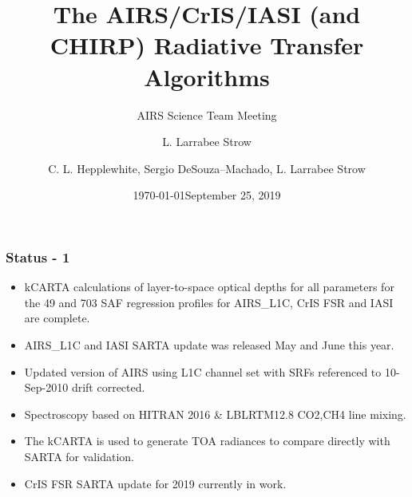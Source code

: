 \documentclass[10pt,t]{beamer}
\author{L. Larrabee Strow}
\date{\today}
\title{\large The AIRS/CrIS/IASI (and CHIRP) \newline
 Radiative Transfer Algorithms }
\subtitle{\footnotesize{AIRS Science Team Meeting}}
\date{\vspace{0.1in}\footnotesize{September 25, 2019 \vfill}}
\author{C. L. Hepplewhite\inst{1,2}, Sergio DeSouza--Machado\inst{1,2}, L. Larrabee Strow\inst{1,2}}
\institute[UMBC]{\inst{1} UMBC Physics Dept. \and \inst{2}UMBC JCET}
\begin{document}
\maketitle
{}

    

\begin{frame}
  \frametitle{Status - 1}
  \begin{itemize}
  \item kCARTA calculations of layer-to-space optical depths for all parameters for the 49 and 703 SAF regression profiles for AIRS\_L1C, CrIS FSR and IASI are complete. 
  \item AIRS\_L1C and IASI SARTA update was released May and June this year.
  \item Updated version of AIRS using L1C channel set with SRFs referenced to 10-Sep-2010 drift corrected. 
  \item Spectroscopy based on HITRAN 2016 \& LBLRTM12.8 CO2,CH4 line mixing.
  \item The kCARTA is used to generate TOA radiances to compare directly with SARTA for validation.
  \item CrIS FSR SARTA update for 2019 currently in work.
  
  \end{itemize}
\end{frame}
\end{document}
